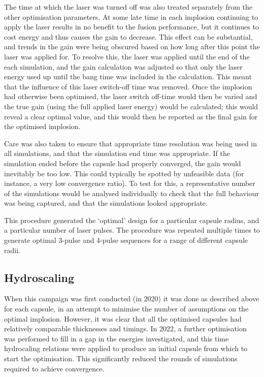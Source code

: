 The time at which the laser was turned off was also treated separately from the other optimisation parameters. At some late time in each implosion continuing to apply the laser results in no benefit to the fusion performance, but it continues to cost energy and thus causes the gain to decrease. This effect can be substantial, and trends in the gain were being obscured based on how long after this point the laser was applied for. To resolve this, the laser was applied until the end of the each simulation, and the gain calculation was adjusted so that only the laser energy used up until the bang time was included in the calculation. This meant that the influence of this laser switch-off time was removed. Once the implosion had otherwise been optimised, the laser switch off-time would then be varied and the true gain (using the full applied laser energy) would be calculated; this would reveal a clear optimal value, and this would then be reported as the final gain for the optimised implosion.

Care was also taken to ensure that appropriate time resolution was being used in all simulations, and that the simulation end time was appropriate. If the simulation ended before the capsule had properly converged, the gain would inevitably be too low. This could typically be spotted by unfeasible data (for instance, a very low convergence ratio). To test for this, a representative number of the simulations would be analysed individually to check that the full behaviour was being captured, and that the simulations looked appropriate.

This procedure generated the `optimal' design for a particular capsule radius, and a particular number of laser pulses. The procedure was repeated multiple times to generate optimal 3-pulse and 4-pulse sequences for a range of different capsule radii.

\subsection{Hydroscaling}

When this campaign was first conducted (in 2020) it was done as described above for each capsule, in an attempt to minimise the number of assumptions on the optimal implosion. However, it was clear that all the optimised capsules had relatively comparable thicknesses and timings. In 2022, a further optimisation was performed to fill in a gap in the energies investigated, and this time hydrocaling relations were applied to produce an initial capsule from which to start the optimisation. This significantly reduced the rounds of simulations required to achieve convergence.

